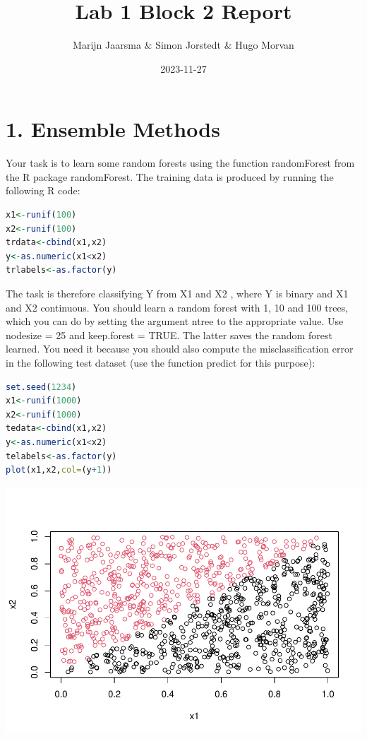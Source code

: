 \documentclass[
]{article}
\title{Lab 1 Block 2 Report}
\author{Marijn Jaarsma \& Simon Jorstedt \& Hugo Morvan}
\date{2023-11-27}
\begin{document}
\maketitle

\hypertarget{ensemble-methods}{%
\section{1. Ensemble Methods}\label{ensemble-methods}}

Your task is to learn some random forests using the function
randomForest from the R package randomForest. The training data is
produced by running the following R code:

\begin{lstlisting}[language=R]
x1<-runif(100)
x2<-runif(100)
trdata<-cbind(x1,x2)
y<-as.numeric(x1<x2)
trlabels<-as.factor(y)
\end{lstlisting}

The task is therefore classifying Y from X1 and X2 , where Y is binary
and X1 and X2 continuous. You should learn a random forest with 1, 10
and 100 trees, which you can do by setting the argument ntree to the
appropriate value. Use nodesize = 25 and keep.forest = TRUE. The latter
saves the random forest learned. You need it because you should also
compute the misclassification error in the following test dataset (use
the function predict for this purpose):

\begin{lstlisting}[language=R]
set.seed(1234)
x1<-runif(1000)
x2<-runif(1000)
tedata<-cbind(x1,x2)
y<-as.numeric(x1<x2)
telabels<-as.factor(y)
plot(x1,x2,col=(y+1))
\end{lstlisting}

\includegraphics{Block2Lab1_files/figure-latex/1.1-1.pdf}
\end{document}
